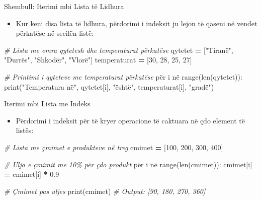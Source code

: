 \documentclass[
  ignorenonframetext,
]{beamer}
\newenvironment{Shaded}{\begin{snugshade}}{\end{snugshade}}
\newcommand{\BuiltInTok}[1]{#1}
\newcommand{\CommentTok}[1]{\textcolor[rgb]{0.56,0.35,0.01}{\textit{#1}}}
\newcommand{\DecValTok}[1]{\textcolor[rgb]{0.00,0.00,0.81}{#1}}
\newcommand{\FloatTok}[1]{\textcolor[rgb]{0.00,0.00,0.81}{#1}}
\newcommand{\NormalTok}[1]{#1}
\newcommand{\OperatorTok}[1]{\textcolor[rgb]{0.81,0.36,0.00}{\textbf{#1}}}
\newcommand{\StringTok}[1]{\textcolor[rgb]{0.31,0.60,0.02}{#1}}
\providecommand{\tightlist}{%
  \setlength{\itemsep}{0pt}\setlength{\parskip}{0pt}}
\begin{document}
\begin{frame}[fragile]{Shembull: Iterimi mbi Lista të Lidhura}
\protect\hypertarget{shembull-iterimi-mbi-lista-tuxeb-lidhura}{}
\begin{itemize}
\tightlist
\item
  Kur keni disa lista të lidhura, përdorimi i indeksit ju lejon të
  qaseni në vendet përkatëse në secilën listë:
\end{itemize}

\begin{Shaded}
\begin{Highlighting}[]
\CommentTok{\# Lista me emra qytetesh dhe temperaturat përkatëse}
\NormalTok{qytetet }\OperatorTok{=}\NormalTok{ [}\StringTok{"Tiranë"}\NormalTok{, }\StringTok{"Durrës"}\NormalTok{, }\StringTok{"Shkodër"}\NormalTok{, }\StringTok{"Vlorë"}\NormalTok{]}
\NormalTok{temperaturat }\OperatorTok{=}\NormalTok{ [}\DecValTok{30}\NormalTok{, }\DecValTok{28}\NormalTok{, }\DecValTok{25}\NormalTok{, }\DecValTok{27}\NormalTok{]}

\CommentTok{\# Printimi i qyteteve me temperaturat përkatëse}
\NormalTok{për i në }\BuiltInTok{range}\NormalTok{(}\BuiltInTok{len}\NormalTok{(qytetet)):}
    \BuiltInTok{print}\NormalTok{(}\StringTok{"Temperatura në"}\NormalTok{, qytetet[i], }\StringTok{"është"}\NormalTok{, temperaturat[i], }\StringTok{"gradë"}\NormalTok{)}
\end{Highlighting}
\end{Shaded}
\end{frame}

\begin{frame}[fragile]{Iterimi mbi Lista me Indeks}
\protect\hypertarget{iterimi-mbi-lista-me-indeks}{}
\begin{itemize}
\tightlist
\item
  Përdorimi i indeksit për të kryer operacione të caktuara në çdo
  element të listës:
\end{itemize}

\begin{Shaded}
\begin{Highlighting}[]
\CommentTok{\# Lista me çmimet e produkteve në treg}
\NormalTok{cmimet }\OperatorTok{=}\NormalTok{ [}\DecValTok{100}\NormalTok{, }\DecValTok{200}\NormalTok{, }\DecValTok{300}\NormalTok{, }\DecValTok{400}\NormalTok{]}

\CommentTok{\# Ulja e çmimit me 10\% për çdo produkt}
\NormalTok{për i në }\BuiltInTok{range}\NormalTok{(}\BuiltInTok{len}\NormalTok{(cmimet)):}
\NormalTok{    cmimet[i] }\OperatorTok{=}\NormalTok{ cmimet[i] }\OperatorTok{*} \FloatTok{0.9}

\CommentTok{\# Çmimet pas uljes}
\BuiltInTok{print}\NormalTok{(cmimet)  }\CommentTok{\# Output: [90, 180, 270, 360]}
\end{Highlighting}
\end{Shaded}
\end{frame}
\end{document}
